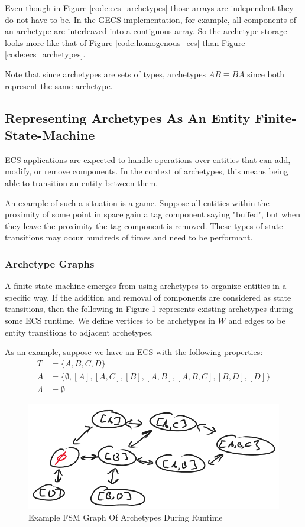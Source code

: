 Even though in Figure \ref{code:ecs_archetypes} those arrays are independent they do not have to be. In the GECS implementation, for example, all components of an archetype are interleaved into a contiguous array. So the archetype storage looks more like that of Figure \ref{code:homogenous_ecs} than Figure \ref{code:ecs_archetypes}.

Note that since archetypes are sets of types, archetypes $AB \equiv BA$ since both represent the same archetype.

\subsection{Representing Archetypes As An Entity Finite-State-Machine}
\label{sec:fsm_arc}
ECS applications are expected to handle operations over entities that can add, modify, or remove components. In the context of archetypes, this means being able to transition an entity between them. 

An example of such a situation is a game. Suppose all entities within the proximity of some point in space gain a tag component saying "buffed", but when they leave the proximity the tag component is removed. These types of state transitions may occur hundreds of times and need to be performant. 

\subsubsection{Archetype Graphs}

A finite state machine emerges from using archetypes to organize entities in a specific way. If the addition and removal of components are considered as state transitions, then the following in Figure \ref{fig:graph1} represents existing archetypes during some ECS runtime. We define vertices to be archetypes in $W$ and edges to be entity transitions to adjacent archetypes.

As an example, suppose we have an ECS with the following properties:
\begin{align}
    T &= \{A,B,C,D\} \\
    A &= \{ \emptyset, [A] , [A,C] ,[B], [A,B], [A,B,C], [B,D], [D]\} \\
    \Lambda &= \emptyset
\end{align}

\begin{figure}[htbp]
    \centering
    \includegraphics[width=0.5\linewidth]{resources/graph1.png}
    \caption{Example FSM Graph Of Archetypes During Runtime}
    \label{fig:graph1}
\end{figure}
                                                         
